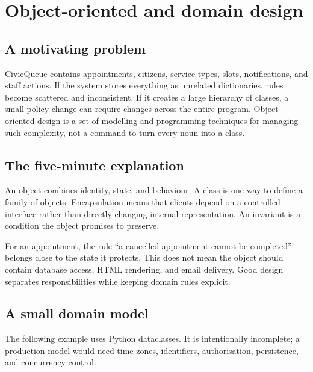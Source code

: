 \chapter{Object-oriented and domain design}
\label{ch:oop}

\section{A motivating problem}
CivicQueue contains appointments, citizens, service types, slots, notifications, and staff actions. If the system stores everything as unrelated dictionaries, rules become scattered and inconsistent. If it creates a large hierarchy of classes, a small policy change can require changes across the entire program. Object-oriented design is a set of modelling and programming techniques for managing such complexity, not a command to turn every noun into a class.


\section{The five-minute explanation}
An object combines identity, state, and behaviour. A class is one way to define a family of objects. Encapsulation means that clients depend on a controlled interface rather than directly changing internal representation. An invariant is a condition the object promises to preserve.

For an appointment, the rule \enquote{a cancelled appointment cannot be completed} belongs close to the state it protects. This does not mean the object should contain database access, HTML rendering, and email delivery. Good design separates responsibilities while keeping domain rules explicit.

\section{A small domain model}
The following example uses Python dataclasses. It is intentionally incomplete; a production model would need time zones, identifiers, authorisation, persistence, and concurrency control.

